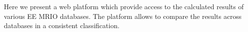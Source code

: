Here we present a web platform which provide access to the calculated results of
various EE MRIO databases. The platform allows to compare the results across
databases in a consistent classification. 